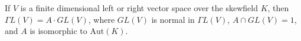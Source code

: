 If $V$ is a finite dimensional left or right vector space over the skewfield $K$, then $\Gamma L(V) = A \cdot GL(V)$, where $GL(V)$ is normal in $\Gamma L(V)$, $A \cap GL(V) = 1$, and $A$ is isomorphic to $\mathrm{Aut}(K)$.
